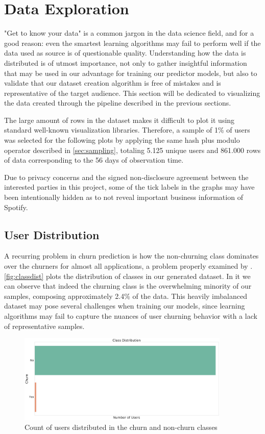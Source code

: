 \documentclass{kththesis}
\begin{document}
\section{Data Exploration}

"Get to know your data" is a common jargon in the data science field, and for a good reason: even the smartest learning algorithms may fail to perform well if the data used as source is of questionable quality. Understanding how the data is distributed is of utmost importance, not only to gather insightful information that may be used in our advantage for training our predictor models, but also to validate that our dataset creation algorithm is free of mistakes and is representative of the target audience. This section will be dedicated to visualizing the data created through the pipeline described in the previous sections.

The large amount of rows in the dataset makes it difficult to plot it using standard well-known visualization libraries. Therefore, a sample of 1\% of users was selected for the following plots by applying the same hash plus modulo operator described in \autoref{sec:sampling}, totaling 5.125 unique users and 861.000 rows of data corresponding to the 56 days of observation time.

Due to privacy concerns and the signed non-disclosure agreement between the interested parties in this project, some of the tick labels in the graphs may have been intentionally hidden as to not reveal important business information of Spotify.

\subsection{User Distribution}

A recurring problem in churn prediction is how the non-churning class dominates over the churners for almost all applications, a problem properly examined by \citep{Burez2009}. \autoref{fig:classdist} plots the distribution of classes in our generated dataset. In it we can observe that indeed the churning class is the overwhelming minority of our samples, composing approximately 2.4\% of the data. This heavily imbalanced dataset may pose several challenges when training our models, since learning algorithms may fail to capture the nuances of user churning behavior with a lack of representative samples.

	\begin{figure}[H]
    \centering
    \includegraphics[width=0.9\textwidth,height=0.9\textheight,keepaspectratio]{figures/class_dist.pdf}
    \caption{Count of users distributed in the churn and non-churn classes}
    \label{fig:classdist}
	\end{figure}
\end{document}

